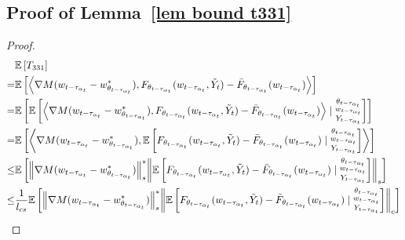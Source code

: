 \documentclass[twoside,11pt]{article}
\newcommand{\E}{\mathbb{E}}
\newcommand{\indot}[2]{{\left<#1, #2\right>}}
\numberwithin{assucounter}{section}
\begin{document}
\subsection{Proof of Lemma~\ref{lem bound t331}}
\label{sec proof lem bound t331}
\lemboundtthreethreeone*
\begin{proof}
  \begin{align}
      \label{eq conditional independence t331}
      &\E\left[T_{331}\right] \\
      = &\E\left[\indot{\nabla M(w_{t-\tau_{\alpha_t}} - w^*_{\theta_{t-\tau_{\alpha_t}}})}{F_{\theta_{t - \tau_{\alpha_t}}}(w_{t- \tau_{\alpha_t}}, \tilde Y_t) - \bar F_{\theta_{t-\tau_{\alpha_t}}}(w_{t- \tau_{\alpha_t}})}\right] \\
      =&\E \left[ \E\left[\indot{\nabla M(w_{t-\tau_{\alpha_t}} - w^*_{\theta_{t-\tau_{\alpha_t}}})}{F_{\theta_{t - \tau_{\alpha_t}}}(w_{t- \tau_{\alpha_t}}, \tilde Y_t) - \bar F_{\theta_{t-\tau_{\alpha_t}}}(w_{t- \tau_{\alpha_t}})} \mid \substack{\theta_{t-\tau_{\alpha_t}} \\ w_{t-\tau_{\alpha_t}} \\ Y_{t-\tau_{\alpha_t}}} \right] \right]\\
      =&\E \left[ \indot{\nabla M(w_{t-\tau_{\alpha_t}} - w^*_{\theta_{t-\tau_{\alpha_t}}})}{\E\left[F_{\theta_{t - \tau_{\alpha_t}}}(w_{t- \tau_{\alpha_t}}, \tilde Y_t) - \bar F_{\theta_{t-\tau_{\alpha_t}}}(w_{t- \tau_{\alpha_t}})\mid \substack{\theta_{t-\tau_{\alpha_t}} \\ w_{t-\tau_{\alpha_t}} \\ Y_{t-\tau_{\alpha_t}}} \right] }\right] \\
      \leq&\E \left[ \norm{\nabla M(w_{t-\tau_{\alpha_t}} - w^*_{\theta_{t-\tau_{\alpha_t}}})}_s^* \norm{\E\left[F_{\theta_{t - \tau_{\alpha_t}}}(w_{t- \tau_{\alpha_t}}, \tilde Y_t) - \bar F_{\theta_{t-\tau_{\alpha_t}}}(w_{t- \tau_{\alpha_t}})\mid \substack{\theta_{t-\tau_{\alpha_t}} \\ w_{t-\tau_{\alpha_t}} \\ Y_{t-\tau_{\alpha_t}}} \right] }_s \right] \\
      \leq&\frac{1}{l_{cs}}\E \left[ \norm{\nabla M(w_{t-\tau_{\alpha_t}} - w^*_{\theta_{t-\tau_{\alpha_t}}})}_s^* \norm{\E\left[F_{\theta_{t - \tau_{\alpha_t}}}(w_{t- \tau_{\alpha_t}}, \tilde Y_t) - \bar F_{\theta_{t-\tau_{\alpha_t}}}(w_{t- \tau_{\alpha_t}})\mid \substack{\theta_{t-\tau_{\alpha_t}} \\ w_{t-\tau_{\alpha_t}} \\ Y_{t-\tau_{\alpha_t}}} \right] }_c \right]

\end{align}
\end{proof}
\end{document}
